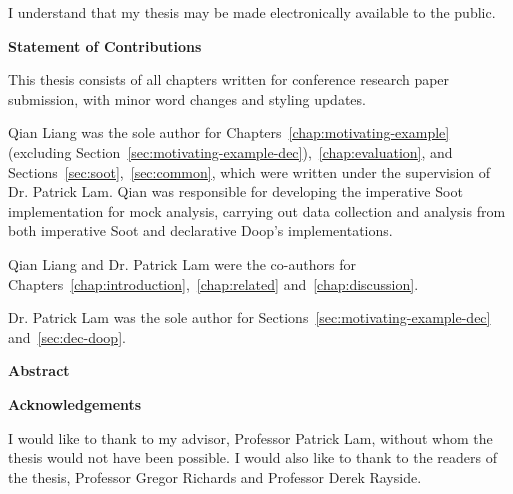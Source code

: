   \noindent
I understand that my thesis may be made electronically available to the public.

\cleardoublepage

\begin{center}\textbf{Statement of Contributions}\end{center}

This thesis consists of all chapters written for conference research paper submission, with minor word changes and styling updates.

Qian Liang was the sole author for Chapters~\ref{chap:motivating-example} (excluding Section~\ref{sec:motivating-example-dec}),~\ref{chap:evaluation}, and Sections~\ref{sec:soot},~\ref{sec:common}, which were written under the supervision of Dr. Patrick Lam. Qian was responsible for developing the imperative Soot implementation for mock analysis, carrying out data collection and analysis from both imperative Soot and declarative Doop's implementations.

Qian Liang and Dr. Patrick Lam were the co-authors for Chapters~\ref{chap:introduction},~\ref{chap:related} and~\ref{chap:discussion}. 

Dr. Patrick Lam was the sole author for Sections~\ref{sec:motivating-example-dec} and~\ref{sec:dec-doop}.

\cleardoublepage


\begin{center}\textbf{Abstract}\end{center}




\cleardoublepage


\begin{center}\textbf{Acknowledgements}\end{center}

I would like to thank to my advisor, Professor Patrick Lam, without whom the thesis
would not have been possible. I would also like to thank to the readers of the thesis,
Professor Gregor Richards and Professor Derek Rayside.
\cleardoublepage


